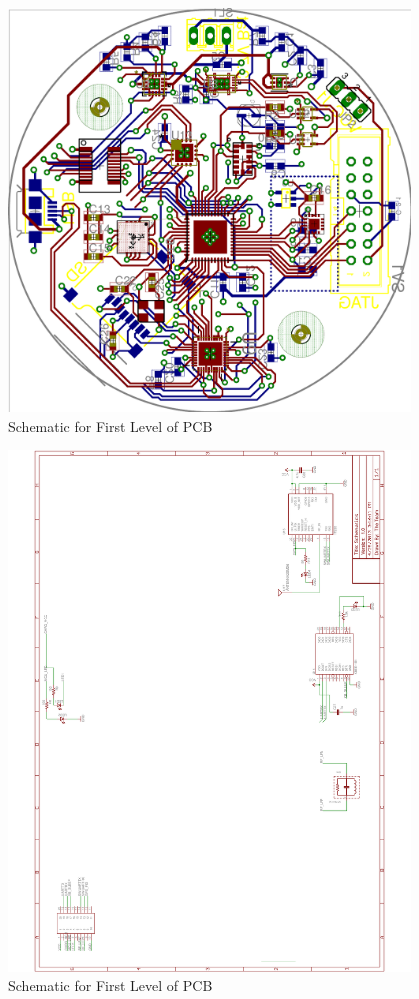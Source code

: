 \begin{figure}[H]
	\centering
	\includegraphics[width=0.95\textwidth]{img/1stLvlBoard.png}
	\caption{Schematic for First Level of PCB \label{fig:1stLvlBoard}}
\end{figure}

\begin{figure}[H]
	\centering
	\includegraphics[width=0.95\textwidth]{img/2ndLvlSchem}
	\caption{Schematic for First Level of PCB \label{fig:2ndLvlSchem}}
\end{figure}

